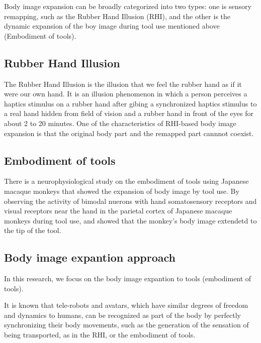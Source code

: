 \documentclass[letterpaper, 10 pt, conference]{ieeeconf}  %
\begin{document}
                Body image expansion can be broadly categorized into two types: one is sensory remapping, such as the Rubber Hand Illusion (RHI), and the other is the dynamic expansion of the boy image during tool use mentioned above (Embodiment of tools).  

        \subsection{Rubber Hand Illusion}
                The Rubber Hand Illusion is the illusion that we feel the rubber hand as if it were our own hand.  
                It is an illusion phenomenon in which a person perceives a haptics stimulus on a rubber hand after gibing a synchronized haptics stimulus to a real hand hidden from field of vision and a rubber hand in front of the eyes for about 2 to 20 minutes.  
                One of the characteristics of RHI-based body image expansion is that the original body part and the remapped part cannnot coexist.

        \subsection{Embodiment of tools}
                There is a neurophysiological study on the embodiment of tools using Japanese macaque monkeys that showed the expansion of body image by tool use.  
                By observing the activity of bimodal nuerons with hand somatosensory receptors and visual receptors near the hand in the parietal cortex of Japanese macaque monkeys during tool use, and showed that the monkey's body image extendetd to the tip of the tool\cite{iriki1996coding}.
                

        \subsection{Body image expantion approach}
                In this research, we focus on the body image expantion to tools (embodiment of tools).

                It is known that tele-robots and avatars, which have similar degrees of freedom and dynamics to humans, can be recognized as part of the body by perfectly synchronizing their body movements, such as the generation of the sensation of being transported, as in the RHI, or the embodiment of tools.
                
\end{document}

